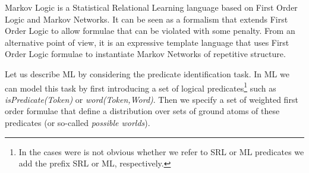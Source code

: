 Markov Logic \citep[ML, ][]{richardson05markov} is a Statistical Relational Learning language based on First Order Logic and Markov Networks. It can be seen as a formalism that extends First Order Logic to allow formulae that can be violated
with some penalty. From an alternative point of view, it is an expressive
template language that uses First Order Logic formulae to instantiate
Markov Networks of repetitive structure. 

Let us describe ML by considering the predicate identification task. In ML we can model this task by first introducing a set of logical predicates\footnote{In the cases were is not obvious whether we refer to SRL or ML predicates we add the prefix SRL or ML, respectively.} such as \emph{isPredicate(Token)} or \emph{word(Token,Word)}. Then we specify a set of weighted first order formulae that define a distribution over sets of ground atoms of these predicates (or so-called \emph{possible worlds}). 

